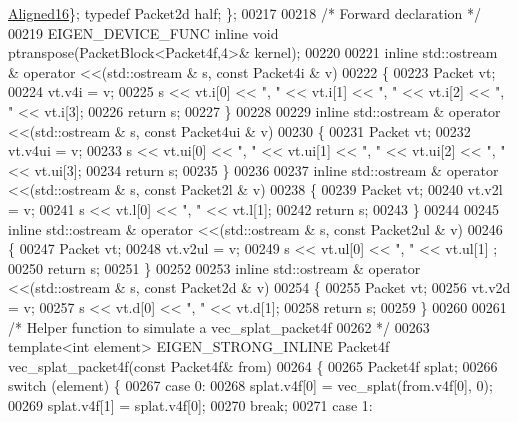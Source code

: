 \begin{DoxyCode}
{      \hyperlink{group__enums_gga45fe06e29902b7a2773de05ba27b47a1af8e2bf74b04c02199f62c5e3c06dbfcc}{Aligned16}\}; \textcolor{keyword}{typedef} Packet2d half; \};
00217 
00218 \textcolor{comment}{/* Forward declaration */}
00219 EIGEN\_DEVICE\_FUNC \textcolor{keyword}{inline} \textcolor{keywordtype}{void} ptranspose(PacketBlock<Packet4f,4>& kernel);
00220  
00221 \textcolor{keyword}{inline} std::ostream & operator <<(std::ostream & s, \textcolor{keyword}{const} Packet4i & v)
00222 \{
00223   Packet vt;
00224   vt.v4i = v;
00225   s << vt.i[0] << \textcolor{stringliteral}{", "} << vt.i[1] << \textcolor{stringliteral}{", "} << vt.i[2] << \textcolor{stringliteral}{", "} << vt.i[3];
00226   \textcolor{keywordflow}{return} s;
00227 \}
00228 
00229 \textcolor{keyword}{inline} std::ostream & operator <<(std::ostream & s, \textcolor{keyword}{const} Packet4ui & v)
00230 \{
00231   Packet vt;
00232   vt.v4ui = v;
00233   s << vt.ui[0] << \textcolor{stringliteral}{", "} << vt.ui[1] << \textcolor{stringliteral}{", "} << vt.ui[2] << \textcolor{stringliteral}{", "} << vt.ui[3];
00234   \textcolor{keywordflow}{return} s;
00235 \}
00236 
00237 \textcolor{keyword}{inline} std::ostream & operator <<(std::ostream & s, \textcolor{keyword}{const} Packet2l & v)
00238 \{
00239   Packet vt;
00240   vt.v2l = v;
00241   s << vt.l[0] << \textcolor{stringliteral}{", "} << vt.l[1];
00242   \textcolor{keywordflow}{return} s;
00243 \}
00244 
00245 \textcolor{keyword}{inline} std::ostream & operator <<(std::ostream & s, \textcolor{keyword}{const} Packet2ul & v)
00246 \{
00247   Packet vt;
00248   vt.v2ul = v;
00249   s << vt.ul[0] << \textcolor{stringliteral}{", "} << vt.ul[1] ;
00250   \textcolor{keywordflow}{return} s;
00251 \}
00252 
00253 \textcolor{keyword}{inline} std::ostream & operator <<(std::ostream & s, \textcolor{keyword}{const} Packet2d & v)
00254 \{
00255   Packet vt;
00256   vt.v2d = v;
00257   s << vt.d[0] << \textcolor{stringliteral}{", "} << vt.d[1];
00258   \textcolor{keywordflow}{return} s;
00259 \}
00260 
00261 \textcolor{comment}{/* Helper function to simulate a vec\_splat\_packet4f}
00262 \textcolor{comment}{ */}
00263 \textcolor{keyword}{template}<\textcolor{keywordtype}{int} element> EIGEN\_STRONG\_INLINE Packet4f vec\_splat\_packet4f(\textcolor{keyword}{const} Packet4f&   from)
00264 \{
00265   Packet4f splat;
00266   \textcolor{keywordflow}{switch} (element) \{
00267   \textcolor{keywordflow}{case} 0:
00268     splat.v4f[0] = vec\_splat(from.v4f[0], 0);
00269     splat.v4f[1] = splat.v4f[0];
00270     \textcolor{keywordflow}{break};
00271   \textcolor{keywordflow}{case} 1:
}
\end{DoxyCode}
